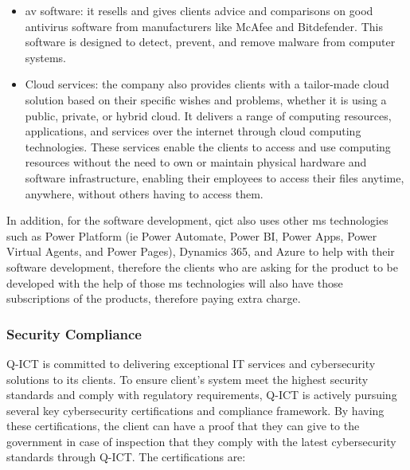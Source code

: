 \begin{itemize}
      \item \acrshort{av} software: it resells and gives clients advice and comparisons on good antivirus software from manufacturers like
            McAfee and Bitdefender. This software is designed to detect, prevent, and remove malware from computer systems.
      \item Cloud services: the company also provides clients with a tailor-made cloud solution based on their specific wishes and
            problems, whether it is using a public, private, or hybrid cloud. It delivers a range of computing resources, applications,
            and services over the internet through cloud computing technologies. These services enable the clients to access and use
            computing resources without the need to own or maintain physical hardware and software infrastructure, enabling their
            employees to access their files anytime, anywhere, without others having to access them.
\end{itemize}

In addition, for the software development, \acrshort{qict} also uses other \acrshort{ms} technologies such as Power Platform
(\acrshort{ie} Power Automate, Power BI, Power Apps, Power Virtual Agents, and Power Pages), Dynamics 365, and Azure to help with their
software development, therefore the clients who are asking for the product to be developed with the help of  those \acrshort{ms}
technologies will also have those subscriptions of the products, therefore paying extra charge.

\subsubsection{Security Compliance}

Q-ICT is committed to delivering exceptional IT services and cybersecurity solutions to its clients. To ensure client's system meet the
highest security standards and comply with regulatory requirements, Q-ICT is actively pursuing several key cybersecurity certifications and
compliance framework. By having these certifications, the client can have a proof that they can give to the government in case of inspection
that they comply with the latest cybersecurity standards through Q-ICT. The certifications are:

